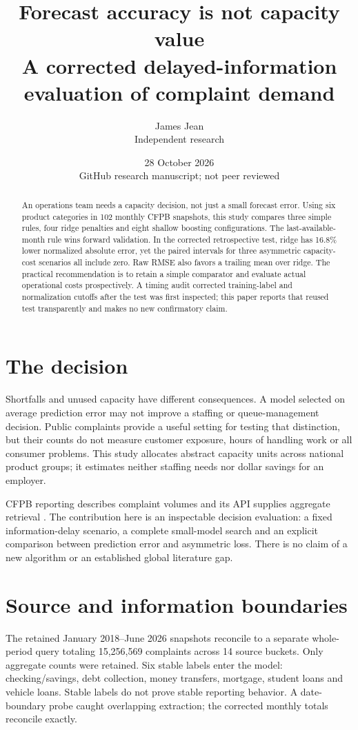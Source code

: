 \documentclass[11pt]{article}
\author{James Jean\\\small Independent research}
\date{28 October 2026\\\small GitHub research manuscript; not peer reviewed}
\title{\color{ink}Forecast accuracy is not capacity value\\[4pt]\large A corrected delayed-information evaluation of complaint demand}
\begin{document}
\maketitle
\begin{abstract}
An operations team needs a capacity decision, not just a small forecast error. Using six product categories in 102 monthly CFPB snapshots, this study compares three simple rules, four ridge penalties and eight shallow boosting configurations. The last-available-month rule wins forward validation. In the corrected retrospective test, ridge has 16.8\% lower normalized absolute error, yet the paired intervals for three asymmetric capacity-cost scenarios all include zero. Raw RMSE also favors a trailing mean over ridge. The practical recommendation is to retain a simple comparator and evaluate actual operational costs prospectively. A timing audit corrected training-label and normalization cutoffs after the test was first inspected; this paper reports that reused test transparently and makes no new confirmatory claim.
\end{abstract}

\section{The decision}
Shortfalls and unused capacity have different consequences. A model selected on average prediction error may not improve a staffing or queue-management decision. Public complaints provide a useful setting for testing that distinction, but their counts do not measure customer exposure, hours of handling work or all consumer problems. This study allocates abstract capacity units across national product groups; it estimates neither staffing needs nor dollar savings for an employer.

CFPB reporting describes complaint volumes and its API supplies aggregate retrieval \cite{cfpb,api}. The contribution here is an inspectable decision evaluation: a fixed information-delay scenario, a complete small-model search and an explicit comparison between prediction error and asymmetric loss. There is no claim of a new algorithm or an established global literature gap.

\section{Source and information boundaries}
The retained January 2018--June 2026 snapshots reconcile to a separate whole-period query totaling 15,256,569 complaints across 14 source buckets. Only aggregate counts were retained. Six stable labels enter the model: checking/savings, debt collection, money transfers, mortgage, student loans and vehicle loans. Stable labels do not prove stable reporting behavior. A date-boundary probe caught overlapping extraction; the corrected monthly totals reconcile exactly.
\end{document}
